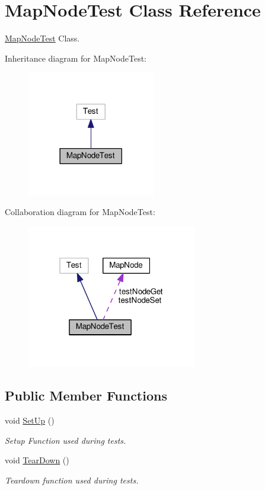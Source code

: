 \hypertarget{classMapNodeTest}{}\section{Map\+Node\+Test Class Reference}
\label{classMapNodeTest}


\hyperlink{classMapNodeTest}{Map\+Node\+Test} Class.  




Inheritance diagram for Map\+Node\+Test\+:
\nopagebreak
\begin{figure}[H]
\begin{center}
\leavevmode
\includegraphics[width=158pt]{classMapNodeTest__inherit__graph}
\end{center}
\end{figure}


Collaboration diagram for Map\+Node\+Test\+:
\nopagebreak
\begin{figure}[H]
\begin{center}
\leavevmode
\includegraphics[width=211pt]{classMapNodeTest__coll__graph}
\end{center}
\end{figure}
\subsection*{Public Member Functions}
\begin{DoxyCompactItemize}
\item 
void \hyperlink{classMapNodeTest_a932784523d427c895556b50866646add}{Set\+Up} ()
\begin{DoxyCompactList}\small\item\em Setup Function used during tests. \end{DoxyCompactList}\item 
void \hyperlink{classMapNodeTest_a5367ace6e713049e58f596a6488a4570}{Tear\+Down} ()
\begin{DoxyCompactList}\small\item\em Teardown function used during tests. \end{DoxyCompactList}\end{DoxyCompactItemize}
